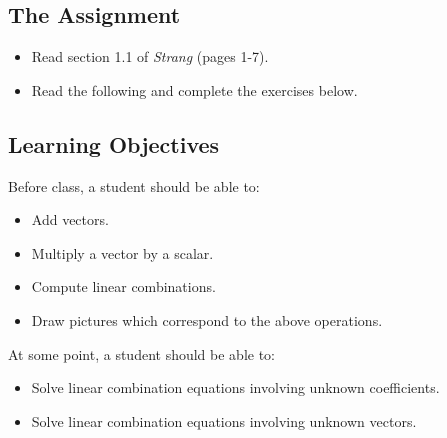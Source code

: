 \documentclass[10pt,]{book}
\theoremstyle{plain}
\numberwithin{equation}{section}
\begin{document}
\subsection[The Assignment]{The Assignment}\label{subsection-1}
\begin{itemize}
\item{}Read section 1.1 of \emph{Strang} (pages 1-7).\item{}Read the following and complete the exercises below.\end{itemize}
\typeout{************************************************}
\typeout{************************************************}
\subsection[Learning Objectives]{Learning Objectives}\label{subsection-2}
Before class, a student should be able to:
      \begin{itemize}
\item{}Add vectors.\item{}Multiply a vector by a scalar.\item{}Compute linear combinations.\item{}Draw pictures which correspond to the above operations.\end{itemize}

      At some point, a student should be able to:
      \begin{itemize}
\item{}Solve linear combination equations involving unknown coefficients.\item{}Solve linear combination equations involving unknown vectors.\end{itemize}

\typeout{************************************************}
\typeout{************************************************}
\end{document}
